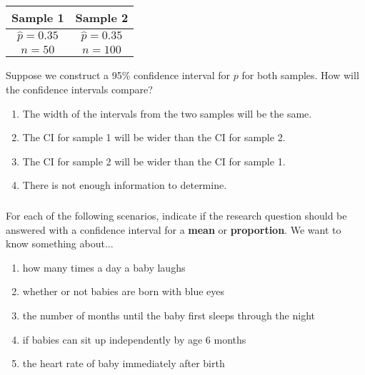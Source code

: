 \begin{frame}
\frametitle{\grp}
\begin{center}
\begin{tabular}{cc}
\hline
 Sample 1 & Sample 2\\
\hline
 $\hat{p}=0.35$        &   $\hat{p}=0.35$ \\
 $n=50$         & $n=100$ \\
 \hline
\end{tabular}
\end{center}
\begin{clicker}{Suppose we construct a 95\% confidence interval for $p$ for both samples.  How will the confidence intervals compare?}
\begin{enumerate}
    \item
    The width of the intervals from the two samples will be the same.
    \item
    The CI for sample 1 will be wider than the CI for sample 2.
    \item
    The CI for sample 2 will be wider than the CI for sample 1.
    \item
    There is not enough information to determine.
 \end{enumerate}
\end{clicker}
\end{frame}

\begin{frame}
\frametitle{\grp}
\begin{clicker}{For each of the following scenarios, indicate if the research question should be answered with a confidence interval for a \textbf{mean} or \textbf{proportion}.  We want to know something about...}{
\begin{enumerate}
\item how many times a day a baby laughs
\item whether or not babies are born with blue eyes
\item the number of months until the baby first sleeps through the night
\item if babies can sit up independently by age 6 months
\item the heart rate of baby immediately after birth
\end{enumerate}
}
\end{clicker}
\end{frame}




